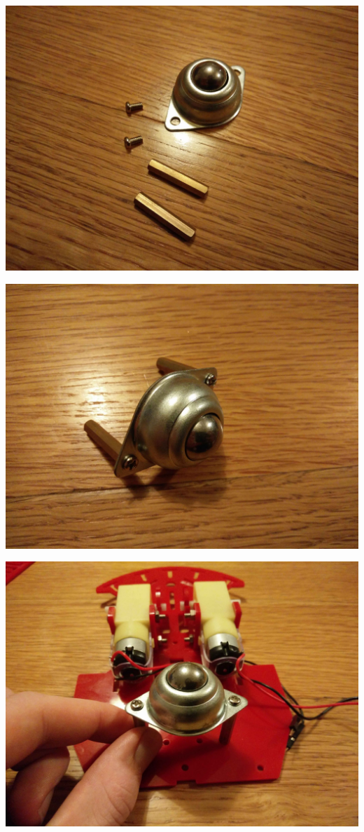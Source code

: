 \documentclass[]{bilingualworkshop}
\begin{document}
    \includegraphics[width=15cm]{img/7.jpg}\par
    \includegraphics[width=15cm]{img/8.jpg}\par
    \includegraphics[width=15cm]{img/9.jpg}\par
\end{document}
